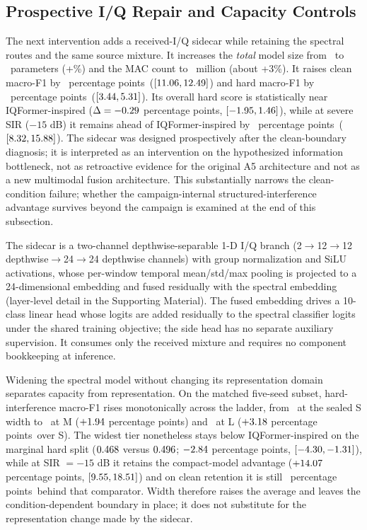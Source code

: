 \documentclass[letterpaper,journal]{IEEEtran}
\newcommand{\pp}{percentage points}
\begin{document}
\subsection{Prospective I/Q Repair and Capacity Controls}
The next intervention adds a received-I/Q sidecar while retaining the spectral
routes and the same source mixture. It increases the \emph{total} model size from \ParamsAFive\ to
\SidecarParameters\ parameters (+\SidecarParamsPct\%) and the MAC count to
\SidecarMacsTotal\ million (about +3\%). It raises clean macro-F1 by \SidecarCleanVsAFiveDiff\ \pp\
($[11.06,12.49]$) and hard macro-F1 by
\SidecarHardVsAFiveDiff\ \pp\
($[3.44,5.31]$). Its overall hard score is
statistically near IQFormer-inspired
($\Delta=-0.29$ \pp,
$[-1.95,1.46]$), while at severe SIR
($-15$ dB) it remains ahead of IQFormer-inspired by \SidecarSevereVsIqformerDiff\ \pp\
($[8.32,15.88]$). The sidecar was
designed prospectively after the clean-boundary diagnosis; it is interpreted
as an intervention on the hypothesized information bottleneck, not as
retroactive evidence for the original A5 architecture and not as a new
multimodal fusion architecture. This substantially narrows the clean-condition
failure; whether the campaign-internal structured-interference advantage
survives beyond the campaign is examined at the end of this subsection.

The sidecar is a two-channel depthwise-separable 1-D I/Q branch (2$\to$12$\to$12
depthwise$\to$24$\to$24 depthwise channels) with group normalization and SiLU
activations, whose per-window temporal mean/std/max pooling is projected to a
24-dimensional embedding and fused residually with the spectral embedding
(layer-level detail in the Supporting Material). The fused embedding drives a
10-class linear head whose logits are added residually to the spectral
classifier logits under the shared training objective; the side head has no
separate auxiliary supervision. It consumes only the received mixture and
requires no component bookkeeping at inference.

Widening the spectral model without changing its representation domain
separates capacity from representation. On the matched five-seed subset,
hard-interference macro-F1 rises monotonically across the ladder, from
\CapacitySFiveSeedAbs\ at the sealed S width to \CapacityMFiveSeedAbs\ at M
($+1.94$ \pp) and \CapacityLFiveSeedAbs\ at L
($+3.18$ \pp\ over S). The widest tier
nonetheless stays below IQFormer-inspired on the marginal hard split
($0.468$ versus $0.496$;
$-2.84$ \pp,
$[-4.30,-1.31]$), while at
SIR $=-15$ dB it retains the compact-model advantage
($+14.07$ \pp,
$[9.55,18.51]$) and on clean
retention it is still \CapacityLCleanVsIqformerGap\ \pp\ behind that comparator.
Width
therefore raises the average and leaves the condition-dependent boundary in
place; it does not substitute for the representation change made by the
sidecar.
\end{document}
